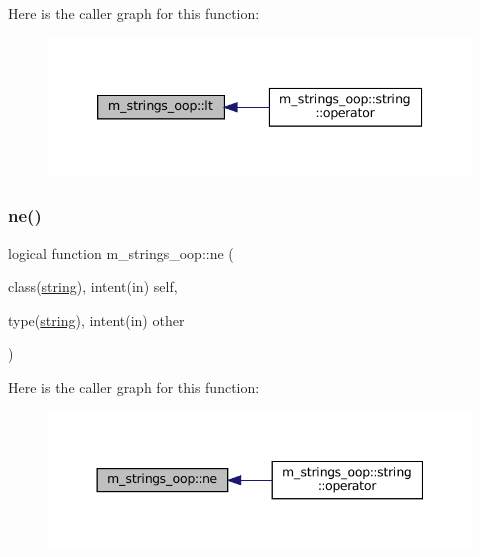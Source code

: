 Here is the caller graph for this function\+:\nopagebreak
\begin{figure}[H]
\begin{center}
\leavevmode
\includegraphics[width=339pt]{namespacem__strings__oop_a332288f9bebc563e12671b514512eb30_icgraph}
\end{center}
\end{figure}
\mbox{\label{namespacem__strings__oop_aa424e1eccc45bb143172d6e212f8e408}} 
\subsubsection{\texorpdfstring{ne()}{ne()}}
{\footnotesize\ttfamily logical function m\+\_\+strings\+\_\+oop\+::ne (\begin{DoxyParamCaption}\item[{class(\mbox{\hyperlink{structm__strings__oop_1_1string}{string}}), intent(in)}]{self,  }\item[{type(\mbox{\hyperlink{structm__strings__oop_1_1string}{string}}), intent(in)}]{other }\end{DoxyParamCaption})\hspace{0.3cm}{\ttfamily [private]}}

Here is the caller graph for this function\+:\nopagebreak
\begin{figure}[H]
\begin{center}
\leavevmode
\includegraphics[width=344pt]{namespacem__strings__oop_aa424e1eccc45bb143172d6e212f8e408_icgraph}
\end{center}
\end{figure}
\mbox{\label{namespacem__strings__oop_a9fa932c23648e737230553a8e7bfb15b}} 
